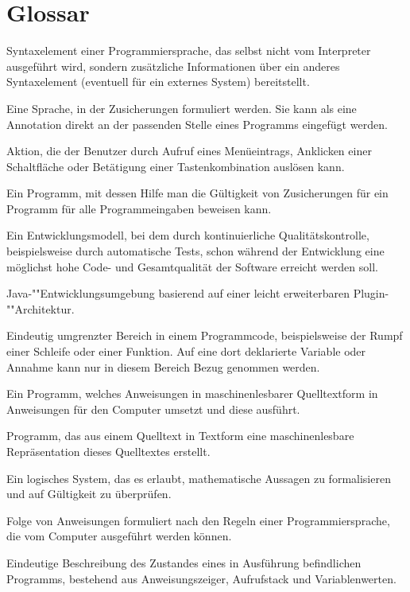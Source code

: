\section{Glossar}
\newcommand{\glossaritem}[1]{\item[#1]}


\begin{description}
    \label{Zusicherung}
    \glossaritem{Annotation} Syntaxelement einer Programmiersprache, das selbst nicht vom Interpreter ausgeführt wird, sondern zusätzliche Informationen über ein anderes Syntaxelement (eventuell für ein externes System) bereitstellt.
    \glossaritem{Annotationssprache (Beweiser)} Eine Sprache, in der Zusicherungen formuliert werden. Sie kann als eine Annotation direkt an der passenden Stelle eines Programms eingefügt werden.
    \glossaritem{Befehl~(GUI)} Aktion, die der Benutzer durch Aufruf eines Menüeintrags, Anklicken einer Schaltfläche oder Betätigung einer Tastenkombination auslösen kann.
    \glossaritem{Beweiser} Ein Programm, mit dessen Hilfe man die Gültigkeit von Zusicherungen für ein Programm für alle Programmeingaben beweisen kann.
    \glossaritem{Continous Integration} Ein Entwicklungsmodell, bei dem durch kontinuierliche Qualitätskontrolle, beispielsweise durch automatische Tests, schon während der Entwicklung eine möglichst hohe Code- und Gesamtqualität der Software erreicht werden soll.
    \glossaritem{Eclipse} Java-""Entwicklungsumgebung basierend auf einer leicht erweiterbaren Plugin-""Architektur.
    \glossaritem{Gültigkeitsbereich} Eindeutig umgrenzter Bereich in einem Programmcode, beispielsweise der Rumpf einer Schleife oder einer Funktion. Auf eine dort deklarierte Variable oder Annahme kann nur in diesem Bereich Bezug genommen werden.
    \glossaritem{Interpreter} Ein Programm, welches Anweisungen in maschinenlesbarer Quelltextform in Anweisungen für den Computer umsetzt und diese ausführt.
    \glossaritem{Parser} Programm, das aus einem Quelltext in Textform eine maschinenlesbare Repräsentation dieses Quelltextes erstellt.
    \glossaritem{Prädikatenlogik} Ein logisches System, das es erlaubt, mathematische Aussagen zu formalisieren und auf Gültigkeit zu überprüfen. %
    \glossaritem{Programm} Folge von Anweisungen formuliert nach den Regeln einer Programmiersprache, die vom Computer ausgeführt werden können.
    \glossaritem{Programmzustand} Eindeutige Beschreibung des Zustandes eines in Ausführung befindlichen Programms, bestehend aus Anweisungszeiger, Aufrufstack und Variablenwerten.

\end{description}
